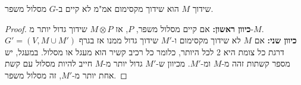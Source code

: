 \begin{theorem}
שידוך $M$ הוא שידוך מקסימום אמ"מ לא קיים ב-$G$ מסלול משפר.
\end{theorem}

\begin{proof}
\textbf{כיוון ראשון:}
אם קיים מסלול משפר, $P$, אז 
$M \otimes P$
שידוך גדול יותר מ-$M$.
\\
\textbf{כיוון שני:}
אם $M$ לא שידוך מקסימום ו-$M'$ שידוך גדול ממנו אז בגרף 
$G' = (V, M \cup M')$
דרגת כל צומת היא 2 לכל היותר, כלומר כל רכיב קשיר הוא מעגל או מסלול.
במעגל, יש מספר קשתות זהה מ-$M$ ומ-$M'$.
מכיוון ש-$M'$ גדול יותר מ-$M$ חייב להיות מסלול עם קשת אחת יותר מ-$M'$, זה מסלול משפר.
\end{proof}

